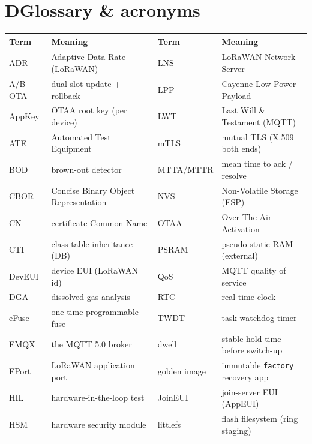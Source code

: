 \section*{D\quad Glossary \& acronyms}
\begin{center}
\renewcommand{\arraystretch}{1.1}\footnotesize
\begin{tabularx}{\textwidth}{@{}l X l X@{}}
\toprule
\textbf{Term} & \textbf{Meaning} & \textbf{Term} & \textbf{Meaning} \\
\midrule
ADR & Adaptive Data Rate (LoRaWAN) & LNS & LoRaWAN Network Server \\
A/B OTA & dual-slot update + rollback & LPP & Cayenne Low Power Payload \\
AppKey & OTAA root key (per device) & LWT & Last Will \& Testament (MQTT) \\
ATE & Automated Test Equipment & mTLS & mutual TLS (X.509 both ends) \\
BOD & brown-out detector & MTTA/MTTR & mean time to ack / resolve \\
CBOR & Concise Binary Object Representation & NVS & Non-Volatile Storage (ESP) \\
CN & certificate Common Name & OTAA & Over-The-Air Activation \\
CTI & class-table inheritance (DB) & PSRAM & pseudo-static RAM (external) \\
DevEUI & device EUI (LoRaWAN id) & QoS & MQTT quality of service \\
DGA & dissolved-gas analysis & RTC & real-time clock \\
eFuse & one-time-programmable fuse & TWDT & task watchdog timer \\
EMQX & the MQTT 5.0 broker & dwell & stable hold time before switch-up \\
FPort & LoRaWAN application port & golden image & immutable \texttt{factory} recovery app \\
HIL & hardware-in-the-loop test & JoinEUI & join-server EUI (AppEUI) \\
HSM & hardware security module & littlefs & flash filesystem (ring staging) \\
\bottomrule
\end{tabularx}
\end{center}
